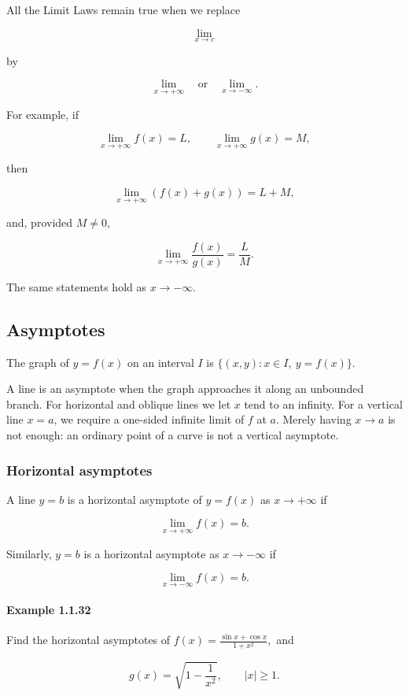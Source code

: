 \documentclass[11pt,a4paper]{article}
\begin{document}
All the Limit Laws remain true when we replace

\[
\lim_{x\to c}
\]

by

\[
\lim_{x\to+\infty}
\quad\text{or}\quad
\lim_{x\to-\infty}.
\]

For example, if

\[
\lim_{x\to+\infty}f(x)=L,
\qquad
\lim_{x\to+\infty}g(x)=M,
\]

then

\[
\lim_{x\to+\infty}(f(x)+g(x))=L+M,
\]

and, provided \(M\neq0\),

\[
\lim_{x\to+\infty}\frac{f(x)}{g(x)}=\frac{L}{M}.
\]

The same statements hold as \(x\to-\infty\).

\subsection{Asymptotes}\label{asymptotes}

The graph of \(y=f(x)\) on an interval \(I\) is
\(\{(x,y):x\in I,\ y=f(x)\}.\)

A line is an asymptote when the graph approaches it along an unbounded
branch. For horizontal and oblique lines we let \(x\) tend to an
infinity. For a vertical line \(x=a\), we require a one-sided infinite
limit of \(f\) at \(a\). Merely having \(x\to a\) is not enough: an
ordinary point of a curve is not a vertical asymptote.

\subsubsection{Horizontal asymptotes}\label{horizontal-asymptotes}

A line \(y=b\) is a horizontal asymptote of \(y=f(x)\) as
\(x\to+\infty\) if

\[
\lim_{x\to+\infty}f(x)=b.
\]

Similarly, \(y=b\) is a horizontal asymptote as \(x\to-\infty\) if

\[
\lim_{x\to-\infty}f(x)=b.
\]

\paragraph{Example 1.1.32}\label{example-1.1.32}

Find the horizontal asymptotes of \(f(x)=\frac{\sin x+\cos x}{1+x^2},\)
and

\[
g(x)=\sqrt{1-\frac{1}{x^2}},\qquad |x|\geq1.
\]
\end{document}
